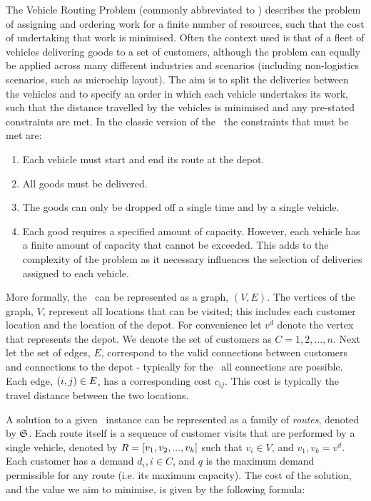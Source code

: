 The Vehicle Routing Problem (commonly abbreviated to \VRP) describes the problem of assigning and ordering work for a finite number of resources, such that the cost of undertaking that work is minimised. Often the context used is that of a fleet of vehicles delivering goods to a set of customers, although the problem can equally be applied across many different industries and scenarios (including non-logistics scenarios, such as microchip layout). The aim is to split the deliveries between the vehicles and to specify an order in which each vehicle undertakes its work, such that the distance travelled by the vehicles is minimised and any pre-stated constraints are met. In the classic version of the \VRP\ the constraints that must be met are: 

\begin{enumerate}
   \item Each vehicle must start and end its route at the depot.
   \item All goods must be delivered.
   \item The goods can only be dropped off a single time and by a single vehicle.
   \item Each good requires a specified amount of capacity. However, each vehicle has a finite amount of capacity that cannot be exceeded. This adds to the complexity of the problem as it necessary influences the selection of deliveries assigned to each vehicle.
\end{enumerate}


More formally, the \VRP\ can be represented as a graph, $(V,E)$. The vertices of the graph, $V$, represent all locations that can be visited; this includes each customer location and the location of the depot. For convenience let $v^d$ denote the vertex that represents the depot. We denote the set of customers as $C = 1,2,...,n$. Next let the set of edges, $E$, correspond to the valid connections between customers and connections to the depot - typically for the \VRP\ all connections are possible. Each edge, $(i,j) \in E$, has a corresponding cost $c_{ij}$. This cost is typically the travel distance between the two locations.

A solution to a given \VRP\ instance can be represented as a family of \emph{routes}, denoted by $\mathfrak{S}$. Each route itself is a sequence of customer visits that are performed by a single vehicle, denoted by $R = [v_1, v_2,..., v_k]$ such that $v_i \in V$, and $v_1, v_k = v^d$. Each customer has a demand $d_i, i \in C$, and $q$ is the maximum demand permissible for any route (i.e. its maximum capacity). The cost of the solution, and the value we aim to minimise, is given by the following formula:

